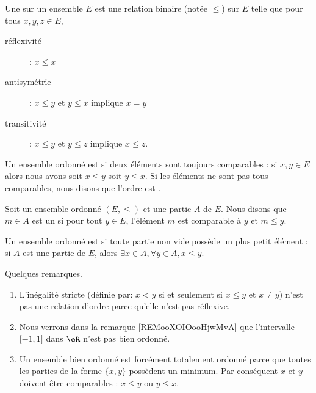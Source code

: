 \begin{definition}      \label{DefooFLYOooRaGYRk}
    Une  sur un ensemble \( E\) est une relation binaire (notée \( \leq\)) sur \( E\) telle que pour tous \( x,y,z\in E\), 
    \begin{description}
        \item[réflexivité]
             : \( x\leq x\)
         \item[antisymétrie] : \( x\leq y\) et \( y\leq x\) implique \( x=y\)
         \item[transitivité] : \( x\leq y\) et \( y\leq z\) implique \( x\leq z\).
    \end{description}
\end{definition}

\begin{definition}      \label{DEFooVGYQooUhUZGr}
    Un ensemble ordonné est  si deux éléments sont toujours comparables : si \( x,y\in E\) alors nous avons soit \( x\leq y\) soit \( y\leq x\). Si les éléments ne sont pas tous comparables, nous disons que l'ordre est .
\end{definition}

\begin{definition}
    Soit un ensemble ordonné \( (E,\leq)\) et une partie \( A\) de \( E\). Nous disons que \( m\in A\) est un  si pour tout \( y\in E\), l'élément \( m\) est comparable à \( y\) et \( m\leq y\).
\end{definition}

\begin{definition}   \label{DEFooLJEAooBLGsiS}
    Un ensemble ordonné est  si toute partie non vide possède un plus petit élément : si \( A\) est une partie de \( E\), alors \( \exists x\in A,\forall y\in A, x\leq y\).
\end{definition}

\begin{normaltext}
    Quelques remarques.
    \begin{enumerate}
        \item 
            L'inégalité stricte (définie par: \( x<y\) si et seulement si \( x\leq y\) et \( x\neq y\)) n'est pas une relation d'ordre parce qu'elle n'est pas réflexive.
        \item
            Nous verrons dans la remarque \ref{REMooXOIOooHjwMvA} que l'intervalle \( \mathopen[ -1 , 1 \mathclose]\) dans \( \eR\) n'est pas bien ordonné.
        \item
            Un ensemble bien ordonné est forcément totalement ordonné parce que toutes les parties de la forme \( \{ x,y \}\) possèdent un minimum. Par conséquent \( x\) et \( y\) doivent être comparables : \( x\leq y\) ou \( y\leq x\).
    \end{enumerate}
\end{normaltext}
            
